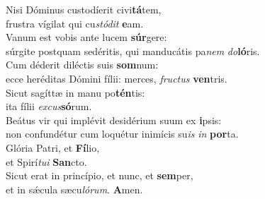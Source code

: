 \evenverse Nisi Dóminus custodíerit civi\textbf{tá}tem,~\*\\
\evenverse frustra vígilat qui cu\textit{stó}\textit{dit} \textbf{e}am.\\
\oddverse Vanum est vobis ante lucem \textbf{súr}gere:~\*\\
\oddverse súrgite postquam sedéritis, qui manducátis pa\textit{nem} \textit{do}\textbf{ló}ris.\\
\evenverse Cum déderit diléctis suis \textbf{som}num:~\*\\
\evenverse ecce heréditas Dómini fílii: merces, \textit{fru}\textit{ctus} \textbf{ven}tris.\\
\oddverse Sicut sagíttæ in manu po\textbf{tén}tis:~\*\\
\oddverse ita fílii \textit{ex}\textit{cus}\textbf{só}rum.\\
\evenverse Beátus vir qui implévit desidérium suum ex \textbf{i}psis:~\*\\
\evenverse non confundétur cum loquétur inimícis su\textit{is} \textit{in} \textbf{por}ta.\\
\oddverse Glória Patri, et \textbf{Fí}lio,~\*\\
\oddverse et Spirí\textit{tu}\textit{i} \textbf{San}cto.\\
\evenverse Sicut erat in princípio, et nunc, et \textbf{sem}per,~\*\\
\evenverse et in sǽcula sæcu\textit{ló}\textit{rum}. \textbf{A}men.\\
